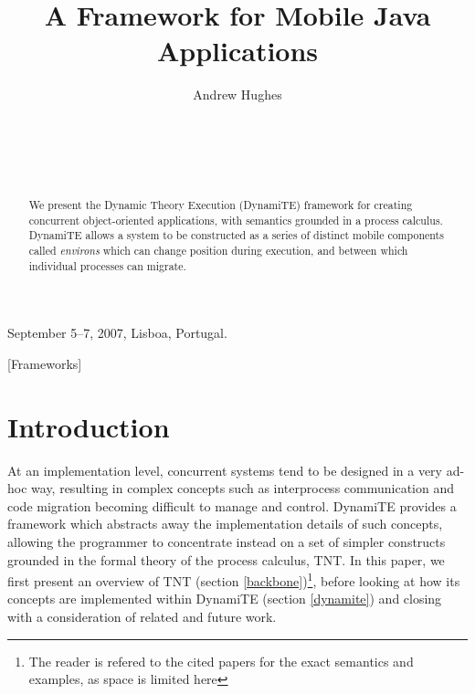 \documentclass{acm_proc_article-sp}
\begin{document}
 {September 5--7, 2007, Lisboa, Portugal.}

\title{A Framework for Mobile Java Applications}
\author{
\alignauthor
Andrew Hughes\\
       \\
       \\
       \\
       \\
}
\maketitle

\begin{abstract}
We present the Dynamic Theory Execution (DynamiTE) framework for
 creating concurrent object-oriented applications, with semantics
 grounded in a process calculus.  DynamiTE allows a system to be
 constructed as a series of distinct mobile components called
 \emph{environs} which can change position during execution, and between
 which individual processes can migrate.
\end{abstract}

[Frameworks]



\section{Introduction}

At an implementation level, concurrent systems tend to be designed in a
very ad-hoc way, resulting in complex concepts such as interprocess
communication and code migration becoming difficult to manage and
control.  DynamiTE provides a framework which abstracts away the
implementation details of such concepts, allowing the programmer to
concentrate instead on a set of simpler constructs grounded in the
formal theory of the process calculus, TNT.  In this paper, we first
present an overview of TNT (section \ref{backbone})\footnote{The reader
is refered to the cited papers for the exact semantics and examples, as
space is limited here}, before looking at how its concepts are
implemented within DynamiTE (section \ref{dynamite}) and closing with a
consideration of related and future work.
 
\end{document}
